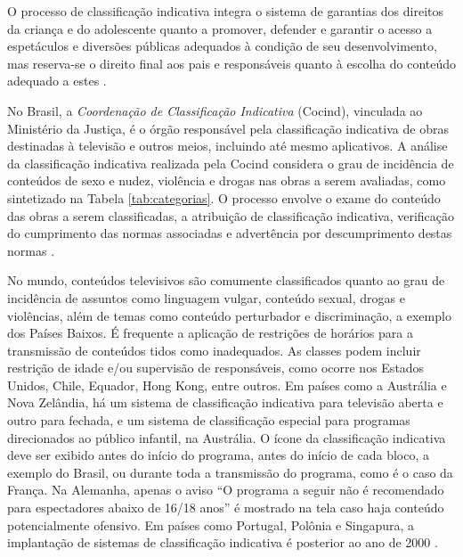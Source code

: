 
O processo de classificação indicativa integra o sistema de garantias dos direitos da criança e do adolescente quanto a promover, defender e garantir o acesso a espetáculos e diversões públicas adequados à condição de seu desenvolvimento, mas reserva-se o direito final aos pais e responsáveis quanto à escolha do conteúdo adequado a estes \cite{eca}.




No Brasil, a \emph{Coordenação de Classificação Indicativa} (Cocind), vinculada ao Ministério da Justiça, é o órgão responsável pela classificação indicativa de obras destinadas à televisão e outros meios, incluindo até mesmo aplicativos. A análise da classificação indicativa realizada pela Cocind considera o grau de incidência de conteúdos de sexo e nudez, violência e drogas nas obras a serem avaliadas, como sintetizado na Tabela \ref{tab:categorias}. O processo envolve o exame do conteúdo das obras a serem classificadas, a atribuição de classificação indicativa, verificação do cumprimento das normas associadas e advertência por descumprimento destas normas \cite{portaria:ci}.

No mundo, conteúdos televisivos são comumente classificados quanto ao grau de incidência de assuntos como linguagem vulgar, conteúdo sexual, drogas e violências, além de temas como conteúdo perturbador e discriminação, a exemplo dos Países Baixos. É frequente a aplicação de restrições de horários para a transmissão de conteúdos tidos como inadequados. As classes podem incluir restrição de idade e/ou supervisão de responsáveis, como ocorre nos Estados Unidos, Chile, Equador, Hong Kong, entre outros. Em países como a Austrália e Nova Zelândia, há um sistema de classificação indicativa para televisão aberta e outro para fechada, e um sistema de classificação especial para programas direcionados ao público infantil, na Austrália. O ícone da classificação indicativa deve ser exibido antes do início do programa, antes do início de cada bloco, a exemplo do Brasil, ou durante toda a transmissão do programa, como é o caso da França.  Na Alemanha, apenas o aviso ``O programa a seguir não é recomendado para espectadores abaixo de 16/18 anos'' é mostrado na tela caso haja conteúdo potencialmente ofensivo. Em países como Portugal, Polônia e Singapura, a implantação de sistemas de classificação indicativa é posterior ao ano de 2000 \cite{televisioncontentwiki}.
